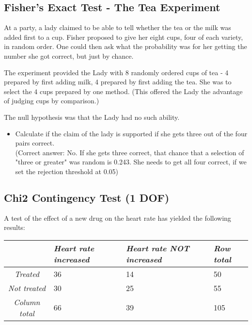 \subsection{Fisher's Exact Test - The Tea Experiment}

At a party, a lady claimed to be able to tell whether the tea or the milk was added first to a cup. Fisher proposed to give her eight cups, four of each variety, in random order. One could then ask what the probability was for her getting the number she got correct, but just by chance.

The experiment provided the Lady with 8 randomly ordered cups of tea - 4 prepared by first adding milk, 4 prepared by first adding the tea. She was to select the 4 cups prepared by one method. (This offered the Lady the advantage of judging cups by comparison.)

The null hypothesis was that the Lady had no such ability.

\begin{itemize}
  \item Calculate if the claim of the lady is supported if she gets three out of the four pairs correct.\\
  (Correct answer: No. If she gets three correct, that chance that a selection of "three or greater" was random is 0.243. She needs to get all four correct, if we set the rejection threshold at 0.05)

\end{itemize}


\subsection{Chi2 Contingency Test (1 DOF)}

A test of the effect of a new drug on the heart rate has yielded the following results:

\begin{table}[h]
  \centering
  \begin{tabular}{|c|l l | l|}
  \hline
  & \emph{Heart rate increased} & \emph{Heart rate NOT increased} & \emph{Row total} \\
  \hline
  \emph{Treated} & 36 & 14 & 50 \\
  \emph{Not treated} & 30 & 25 & 55 \\
  \hline
  \emph{Column total} & 66 & 39 & 105 \\
  \hline
  \end{tabular}
\end{table}

